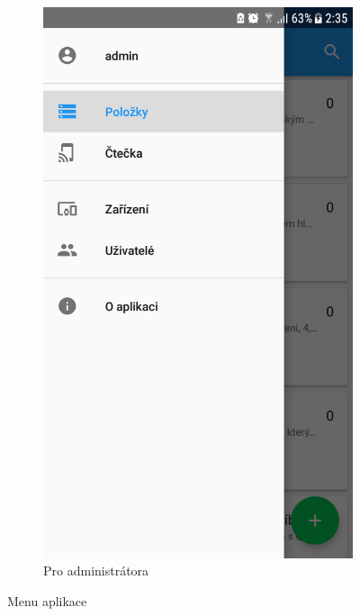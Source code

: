 \documentclass[12pt]{report}
\begin{document}
\begin{figure}[H]
\begin{subfigure}[b]{0.3\textwidth}
	\includegraphics[width=\textwidth]{../images/client_android/Screenshot_20180412-023541.png}	
	\caption{Pro administrátora}
	\label{fig:Screenshot_20180412-023541}
  \end{subfigure}
  \caption{Menu aplikace}
\end{figure}
\end{document}
